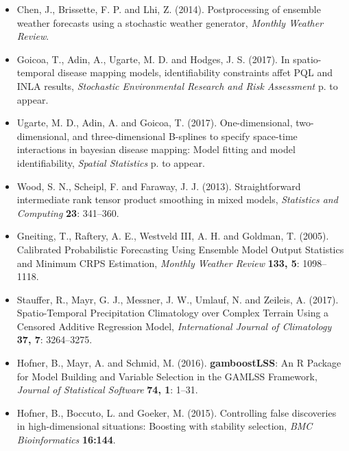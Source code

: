 \documentclass[american,foldmarks=false,noconfig]{uibklttr}
\begin{document}
\begin{itemize}[leftmargin=*]

\item[] Chen, J., Brissette, F. P. and Lhi, Z. (2014). Postprocessing 
of ensemble weather forecasts using a stochastic weather generator, 
\textit{Monthly Weather Review}.

\item[] Goicoa, T., Adin, A., Ugarte, M. D. and Hodges, J. S. (2017). 
In spatio-temporal disease mapping models, identifiability constraints 
affet PQL and INLA results, \textit{Stochastic Environmental Research 
and Risk Assessment} p. to appear.

\item[] Ugarte, M. D., Adin, A. and Goicoa, T. (2017). One-dimensional, 
two-dimensional, and three-dimensional B-splines to specify space-time 
interactions in bayesian disease mapping: Model fitting and model 
identifiability, \textit{Spatial Statistics} p. to appear.

\item[] Wood, S. N., Scheipl, F. and Faraway, J. J. (2013). 
Straightforward intermediate rank tensor product smoothing in mixed models, 
\textit{Statistics and Computing} \textbf{23}: 341--360.

\item[] Gneiting, T., Raftery, A. E., Westveld III, A. H. and Goldman, T. (2005). 
Calibrated Probabilistic Forecasting Using Ensemble Model Output Statistics and 
Minimum CRPS Estimation,
\textit{Monthly Weather Review} \textbf{133, 5}: 1098--1118.

\item[] Stauffer, R., Mayr, G. J., Messner, J. W., Umlauf, N. and Zeileis, A. (2017). 
Spatio-Temporal Precipitation Climatology over Complex Terrain Using a Censored Additive Regression Model,
\textit{International Journal of Climatology} \textbf{37, 7}: 3264--3275.

\item[] Hofner, B., Mayr, A. and Schmid, M. (2016). 
\textbf{gamboostLSS}: An \textsf{R} Package for Model Building and 
Variable Selection in the {GAMLSS} Framework,
\textit{Journal of Statistical Software} \textbf{74, 1}: 1--31.

\item[] Hofner, B., Boccuto, L. and Goeker, M. (2015). 
Controlling false discoveries in high-dimensional situations: Boosting 
with stability selection,
\textit{BMC Bioinformatics} \textbf{16:144}.


\end{itemize}
\end{document}
